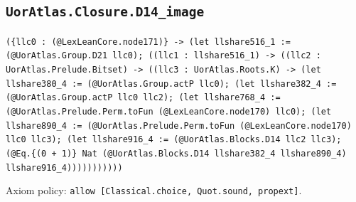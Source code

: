 \documentclass[11pt]{article}
\begin{document}
\subsection*{\texttt{UorAtlas.Closure.D14\_image}}
\noindent\texttt{(\{llc0 : (@LexLeanCore.node171)\} -> (let llshare516\_1 := (@UorAtlas.Group.D21 llc0); ((llc1 : llshare516\_1) -> ((llc2 : UorAtlas.Prelude.Bitset) -> ((llc3 : UorAtlas.Roots.K) -> (let llshare380\_4 := (@UorAtlas.Group.actP llc0); (let llshare382\_4 := (@UorAtlas.Group.actP llc0 llc2); (let llshare768\_4 := (@UorAtlas.Prelude.Perm.toFun (@LexLeanCore.node170) llc0); (let llshare890\_4 := (@UorAtlas.Prelude.Perm.toFun (@LexLeanCore.node170) llc0 llc3); (let llshare916\_4 := (@UorAtlas.Blocks.D14 llc2 llc3); (@Eq.\{(0 + 1)\} Nat (@UorAtlas.Blocks.D14 llshare382\_4 llshare890\_4) llshare916\_4)))))))))))}\par
\noindent Axiom policy: \texttt{allow [Classical.choice, Quot.sound, propext]}.\par
\end{document}
